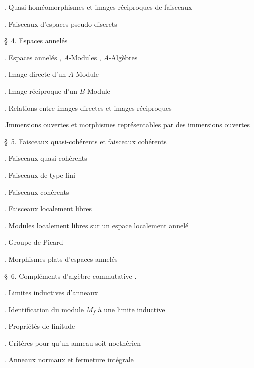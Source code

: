 
\noindent{}. Quasi-homéomorphismes et images réciproques de faisceaux\dotfill

\noindent{}. Faisceaux d'espaces pseudo-discrets\dotfill

\noindent\quad \S\ 4. Espaces annelés\dotfill

\noindent{}. Espaces annelés , $A$-Modules , $A$-Algèbres\dotfill

\noindent{}. Image directe d'un $A$-Module\dotfill

\noindent{}. Image réciproque d'un $B$-Module\dotfill

\noindent{}. Relations entre images directes et images réciproques\dotfill

\noindent{}.Immersions ouvertes et morphismes représentables par des immersions ouvertes \dotfill

\noindent\quad \S\ 5. Faisceaux quasi-cohérents et faisceaux cohérents\dotfill

\noindent{}. Faisceaux quasi-cohérents\dotfill

\noindent{}. Faisceaux de type fini\dotfill

\noindent{}. Faisceaux cohérents\dotfill

\noindent{}. Faisceaux localement libres\dotfill

\noindent{}. Modules localement libres sur un espace localement annelé\dotfill

\noindent{}. Groupe de Picard\dotfill

\noindent{}. Morphismes plats d'espaces annelés\dotfill

\noindent\quad \S\ 6. Compléments d'algèbre commutative .

\noindent{}. Limites inductives d'anneaux\dotfill

\noindent{}. Identification du module $M_f$ à une limite  inductive\dotfill

\noindent{}. Propriétés de finitude\dotfill

\noindent{}. Critères pour qu'un anneau soit noethérien\dotfill

\noindent{}. Anneaux normaux et fermeture intégrale\dotfill
{}


